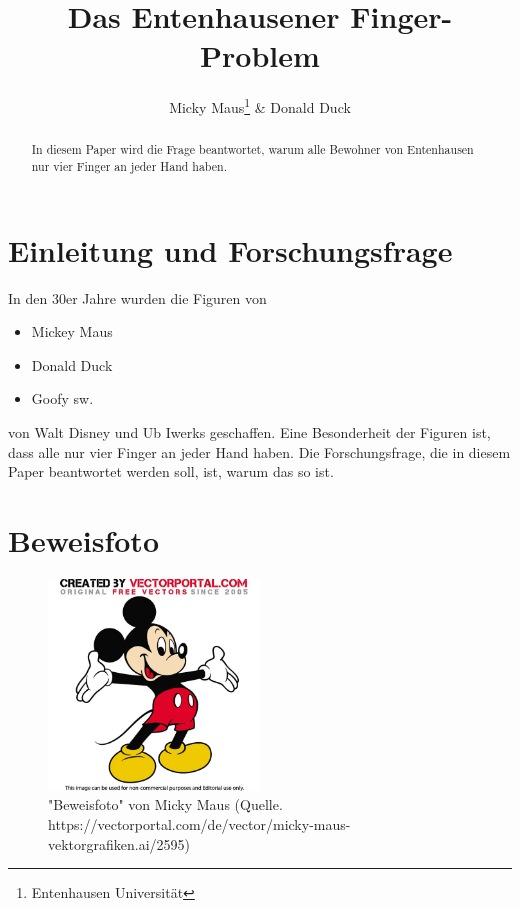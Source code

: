 \documentclass{article}
\begin{document}
\title{Das Entenhausener Finger-Problem}

\author{Micky Maus\footnote{Entenhausen Universität} \& Donald Duck}

\maketitle

\tableofcontents

\begin{abstract}
    In diesem Paper wird die Frage beantwortet, warum alle Bewohner von 
Entenhausen nur vier Finger an jeder Hand haben.
\end{abstract}

\newpage

\section{Einleitung und Forschungsfrage}

In den 30er Jahre wurden die Figuren von 
\begin{itemize}
    \item Mickey Maus \cite{mickey}
    \item Donald Duck  \cite{mickey}
    \item Goofy \cite{mickey} sw. 
\end{itemize}

von Walt Disney und Ub Iwerks geschaffen. Eine Besonderheit der Figuren ist, 
dass alle nur vier Finger an jeder Hand haben. Die Forschungsfrage, die in 
diesem Paper beantwortet werden soll, ist, warum das so ist.

\section*{Beweisfoto}
\begin{figure}[h!]
    \centering
    \includegraphics[width=0.5\textwidth]{mickey-mouse-vectorportal-11582.jpg} %
    \caption{"Beweisfoto" von Micky Maus (Quelle. https://vectorportal.com/de/vector/micky-maus-vektorgrafiken.ai/2595)}
    \label{fig:beweisfoto}
\end{figure}
\end{document}
